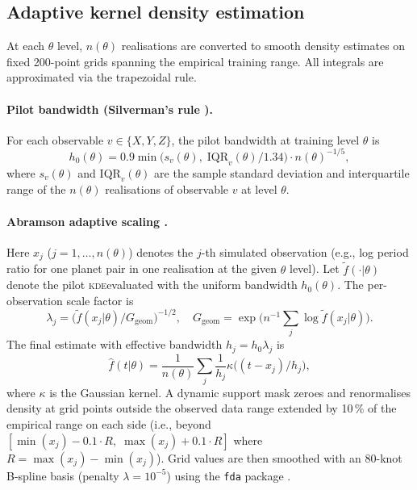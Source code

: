 \documentclass[12pt,a4paper]{article}
\newcommand{\KDE}{\textsc{kde}}
\newcommand{\spar}{\theta}
\begin{document}
\subsection{Adaptive kernel density estimation}
\label{sec:kde}

At each $\spar$ level, $n(\spar)$ realisations are converted to smooth
density estimates on fixed 200-point grids spanning the empirical
training range.  All integrals are approximated via the trapezoidal
rule.

\paragraph{Pilot bandwidth (Silverman's rule \citep{silverman1986}).}
For each observable $v\in\{X,Y,Z\}$, the pilot bandwidth at training
level $\spar$ is
\begin{equation}
  h_0(\spar) = 0.9\min\!\bigl(s_v(\spar),\;
               {\mathrm{IQR}_v(\spar)}/{1.34}\bigr)
               \cdot n(\spar)^{-1/5},
  \label{eq:silverman}
\end{equation}
where $s_v(\spar)$ and $\mathrm{IQR}_v(\spar)$ are the sample standard
deviation and interquartile range of the $n(\spar)$ realisations of
observable $v$ at level $\spar$.

\paragraph{Abramson adaptive scaling \citep{abramson1982}.}
Here $x_j$ ($j=1,\ldots,n(\spar)$) denotes the $j$-th simulated
observation (e.g., log period ratio for one planet pair in one
realisation at the given $\spar$ level).
Let $\tilde{f}(\cdot|\spar)$ denote the pilot \KDE evaluated with
the uniform bandwidth $h_0(\spar)$.  The per-observation scale factor is
\begin{equation}
  \lambda_j =
  \bigl(\tilde{f}(x_j|\spar)/G_{\mathrm{geom}}\bigr)^{-1/2},\quad
  G_{\mathrm{geom}} = \exp\!\bigl(n^{-1}\textstyle\sum_j
                      \log\tilde{f}(x_j|\spar)\bigr).
  \label{eq:abramson}
\end{equation}
The final estimate with effective bandwidth $h_j=h_0\lambda_j$ is
\begin{equation}
  \hat{f}(t|\spar) = \frac{1}{n(\spar)}\sum_j
  \frac{1}{h_j}\kappa\!\bigl((t-x_j)/h_j\bigr),
  \label{eq:kde}
\end{equation}
where $\kappa$ is the Gaussian kernel.  A dynamic support mask zeroes and renormalises density at grid points outside the observed data range extended by 10\,\% of the empirical range on each side (i.e., beyond $[\min(x_j)-0.1\cdot R,\;\max(x_j)+0.1\cdot R]$ where $R=\max(x_j)-\min(x_j)$).
Grid values are then smoothed with an 80-knot B-spline basis
(penalty $\lambda=10^{-5}$) using the \texttt{fda} package
\citep{ramsay2005}.
\end{document}
